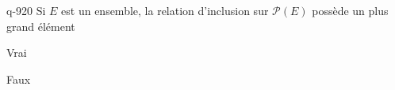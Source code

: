 \begin{truefalse}{q-920}
Si $E$ est un ensemble, la relation d'inclusion sur $\mathcal P(E)$ possède un plus grand élément
\item* Vrai
\item Faux
\end{truefalse}

